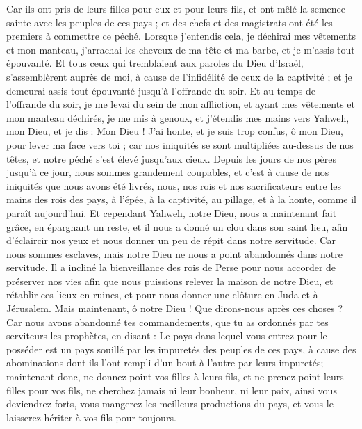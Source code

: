 \begin{multicols}{2}
Car ils ont pris de leurs filles pour eux et pour leurs fils, et ont mêlé la semence sainte avec les peuples de ces pays ; et des chefs et des magistrats ont été les premiers à commettre ce péché.
Lorsque j'entendis cela, je déchirai mes vêtements et mon manteau, j'arrachai les cheveux de ma tête et ma barbe, et je m'assis tout épouvanté.
Et tous ceux qui tremblaient aux paroles du Dieu d'Israël, s'assemblèrent auprès de moi, à cause de l’infidélité de ceux de la captivité ; et je demeurai assis tout épouvanté jusqu'à l'offrande du soir.
Et au temps de l'offrande du soir, je me levai du sein de mon affliction, et ayant mes vêtements et mon manteau déchirés, je me mis à genoux, et j'étendis mes mains vers Yahweh, mon Dieu,
et je dis : Mon Dieu ! J’ai honte, et je suis trop confus, ô mon Dieu, pour lever ma face vers toi ; car nos iniquités se sont multipliées au-dessus de nos têtes, et notre péché s'est élevé jusqu’aux cieux.
Depuis les jours de nos pères jusqu'à ce jour, nous sommes grandement coupables, et c’est à cause de nos iniquités que nous avons été livrés, nous, nos rois et nos sacrificateurs entre les mains des rois des pays, à l'épée, à la captivité, au pillage, et à la honte, comme il paraît aujourd'hui.
Et cependant Yahweh, notre Dieu, nous a maintenant fait grâce, en épargnant un reste, et il nous a donné un clou dans son saint lieu, afin d'éclaircir nos yeux et nous donner un peu de répit dans notre servitude.
Car nous sommes esclaves, mais notre Dieu ne nous a point abandonnés dans notre servitude. Il a incliné la bienveillance des rois de Perse pour nous accorder de préserver nos vies afin que nous puissions relever la maison de notre Dieu, et rétablir ces lieux en ruines, et pour nous donner une clôture en Juda et à Jérusalem.
Mais maintenant, ô notre Dieu ! Que dirons-nous après ces choses ? Car nous avons abandonné tes commandements,
que tu as ordonnés par tes serviteurs les prophètes, en disant : Le pays dans lequel vous entrez pour le posséder est un pays souillé par les impuretés des peuples de ces pays, à cause des abominations dont ils l'ont rempli d’un bout à l'autre par leurs impuretés;
maintenant donc, ne donnez point vos filles à leurs fils, et ne prenez point leurs filles pour vos fils, ne cherchez jamais ni leur bonheur, ni leur paix, ainsi vous deviendrez forts,  vous mangerez les meilleurs productions du pays, et vous le laisserez hériter à vos fils pour toujours.

\end{multicols}
